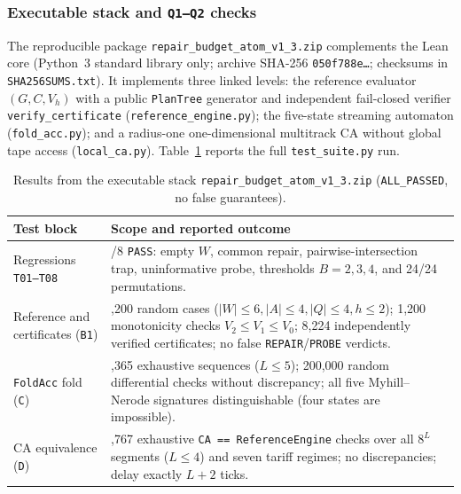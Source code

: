 \documentclass[11pt,a4paper]{article}
\theoremstyle{preprintthm}
\theoremstyle{preprintdef}
\begin{document}
\subsubsection*{Executable stack and \texttt{Q1--Q2} checks}
The reproducible package \texttt{repair\_\allowbreak budget\_\allowbreak atom\_\allowbreak v1\_3.zip} complements the Lean core (Python~3 standard library only; archive SHA-256 \texttt{050f788e\ldots}; checksums in \texttt{SHA256SUMS.txt}). It implements three linked levels: the reference evaluator $(G,C,V_h)$ with a public \texttt{PlanTree} generator and independent fail-closed verifier \texttt{verify\_\allowbreak certificate} (\texttt{reference\_\allowbreak engine.py}); the five-state streaming automaton (\texttt{fold\_acc.py}); and a radius-one one-dimensional multitrack CA without global tape access (\texttt{local\_ca.py}). Table~\ref{tab:exec} reports the full \texttt{test\_suite.py} run.

\begin{table}[!htbp]
\centering
\caption{Results from the executable stack \texttt{repair\_\allowbreak budget\_\allowbreak atom\_\allowbreak v1\_3.zip} (\texttt{ALL\_PASSED}, no false guarantees).}
\label{tab:exec}
\footnotesize
\begin{tabularx}{\linewidth}{@{}l >{\raggedright\arraybackslash}X@{}}
\toprule
\textbf{Test block} & \textbf{Scope and reported outcome} \\
\midrule
Regressions \texttt{T01--T08} & 8/8 \texttt{PASS}: empty $W$, common repair, pairwise-intersection trap, uninformative probe, thresholds $B=2,3,4$, and 24/24 permutations. \\
Reference and certificates (\texttt{B1}) & 1,200 random cases ($|W|\le6,|A|\le4,|Q|\le4,h\le2$); 1,200 monotonicity checks $V_2\le V_1\le V_0$; 8,224 independently verified certificates; no false \texttt{REPAIR}/\texttt{PROBE} verdicts. \\
\texttt{FoldAcc} fold (\texttt{C}) & 1,365 exhaustive sequences ($L\le5$); 200,000 random differential checks without discrepancy; all five Myhill--Nerode signatures distinguishable (four states are impossible). \\
CA equivalence (\texttt{D}) & 32,767 exhaustive \texttt{CA == ReferenceEngine} checks over all $8^L$ segments ($L\le4$) and seven tariff regimes; no discrepancies; delay exactly $L+2$ ticks. \\
\bottomrule
\end{tabularx}
\end{table}
\end{document}
